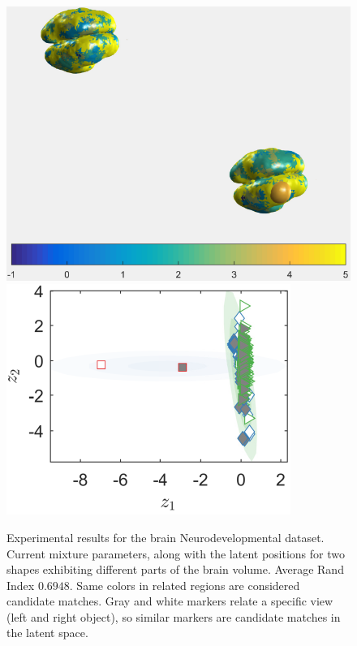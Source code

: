 \documentclass[]{article}
\newcommand{\gD}[2]{\mathcal{N}\left(#1,#2\right)}
\newcommand{\eye}{\mathbf{I}}
\newcommand{\setWv}{\mathbf{W}^{v}}
\newcommand{\setYv}{\mathbf{Y}^{v}}
\newcommand{\setXv}{\mathbf{X}^{v}}
\newcommand{\setZv}{\mathbf{Z}^{v}}
\newcommand{\setFv}{\mathbf{F}^{v}}
\newcommand{\hParams}{\boldsymbol{\theta}}
\begin{document}
\begin{figure}[ht!]
	\centering
	
	\includegraphics[width=0.45\linewidth]{img/babybumpMVMMexp3v}
	\includegraphics[width=0.4\linewidth]{img/babybumpMVMMexp3vv}
	\caption{Experimental results for the brain Neurodevelopmental dataset.  Current mixture parameters, along with the latent positions for two shapes exhibiting different parts of the brain volume. Average Rand Index $0.6948$. Same colors in related regions are considered candidate matches. Gray and white markers relate a specific view (left and right object), so similar markers are candidate matches in the latent space. }
	\label{fig:brainBabybump}
\end{figure}
%
%
%
%
%
%
%




\end{document}
